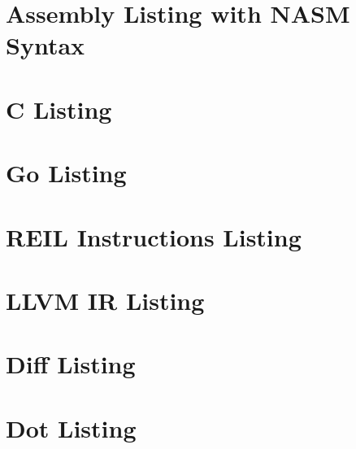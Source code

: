 \documentclass[12pt, a4paper]{article}
\begin{document}
\section{Assembly Listing with NASM Syntax}



\clearpage

\section{C Listing}



\clearpage

\section{Go Listing}



\clearpage

\section{REIL Instructions Listing}



\clearpage

\section{LLVM IR Listing}



\clearpage

\section{Diff Listing}



\clearpage

\section{Dot Listing}


\end{document}
